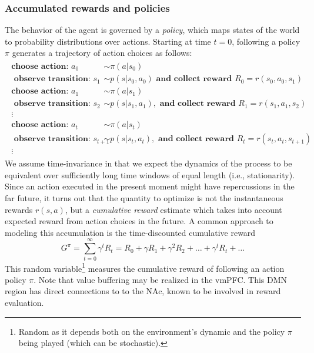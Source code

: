\documentclass[10pt,letterpaper]{article}
\begin{document}
\subsubsection{Accumulated rewards and policies}
The behavior of the agent is governed by a \textit{policy}, which maps states of the world
to probability distributions over actions.
Starting at time $t=0$,
following a policy $\pi$ generates a trajectory of action choices as follows:
\begin{eqnarray*}
  \begin{split}
    \textbf{choose action: }a_0 &\sim \pi(a|s_0)\\
    \textbf{ observe transition: }s_1 &\sim p(s|s_0,a_0)\textbf{ and collect reward }R_0 = r(s_0, a_0, s_1)\\
    \textbf{choose action: }a_1 &\sim \pi(a|s_1)\\
    \textbf{ observe transition: }s_2 &\sim p(s|s_1,a_1), \textbf{ and collect reward }R_1 = r(s_1, a_1,s_2)\\
    \vdots\\
    \textbf{choose action: }a_{t} &\sim \pi(a|s_{t})\\
    \textbf{ observe transition: }s_{t+1} &\sim p(s|s_{t},a_{t}), \textbf{ and collect reward }R_{t} = r(s_{t}, a_{t},s_{t+1})\\
    \vdots
  \end{split}
\end{eqnarray*}
We assume time-invariance
in that we expect the dynamics of the process
to be equivalent over sufficiently long time windows of equal length (i.e., stationarity).
Since an action executed in the present moment might have repercussions in the far future, it turns out that the
quantity to optimize is not the instantaneous rewards $r(s, a)$, but a
\textit{cumulative reward} estimate which takes into account expected reward
from action choices in the future.
A common approach to
modeling this accumulation is the time-discounted cumulative reward%
\begin{equation}
  \label{eq:cumr}
  G^\pi = \sum_{t=0}^{\infty}\gamma^{t}R_t = R_0 + \gamma R_1 + \gamma^2 R_2 + \ldots + \gamma^tR_t + \ldots
\end{equation}
This random variable\footnote{Random as it depends both on the environment's dynamic and the
  policy $\pi$ being played (which can be stochastic).}  measures the cumulative reward of
following an action policy $\pi$.
%
Note that value buffering may be realized in the vmPFC.
This DMN region has direct connections to
to the NAc, known to be involved in reward evaluation.
\end{document}
